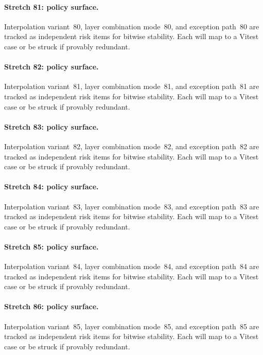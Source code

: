 \documentclass[sigconf,nonacm]{acmart}
\begin{document}
\paragraph{Stretch 81: policy surface.}
Interpolation variant~80, layer combination mode~80, and exception path~80 are tracked as independent risk items for bitwise stability. Each will map to a Vitest case or be struck if provably redundant. %

\paragraph{Stretch 82: policy surface.}
Interpolation variant~81, layer combination mode~81, and exception path~81 are tracked as independent risk items for bitwise stability. Each will map to a Vitest case or be struck if provably redundant. %

\paragraph{Stretch 83: policy surface.}
Interpolation variant~82, layer combination mode~82, and exception path~82 are tracked as independent risk items for bitwise stability. Each will map to a Vitest case or be struck if provably redundant. %

\paragraph{Stretch 84: policy surface.}
Interpolation variant~83, layer combination mode~83, and exception path~83 are tracked as independent risk items for bitwise stability. Each will map to a Vitest case or be struck if provably redundant. %

\paragraph{Stretch 85: policy surface.}
Interpolation variant~84, layer combination mode~84, and exception path~84 are tracked as independent risk items for bitwise stability. Each will map to a Vitest case or be struck if provably redundant. %

\paragraph{Stretch 86: policy surface.}
Interpolation variant~85, layer combination mode~85, and exception path~85 are tracked as independent risk items for bitwise stability. Each will map to a Vitest case or be struck if provably redundant. %
\end{document}
